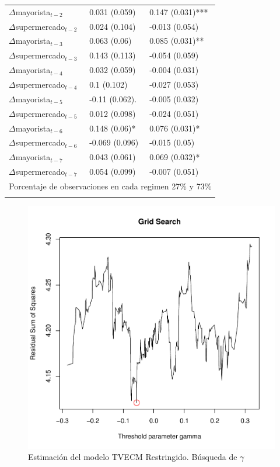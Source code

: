 \begin{table}[H]
\begin{tabular}{@{}lll@{}}
$\Delta$mayorista$_{t -2}$ & 0.031 (0.059) &0.147 (0.031)*** \\
$\Delta$supermercado$_{t -2}$ & 0.024 (0.104) &-0.013 (0.054) \\
$\Delta$mayorista$_{t -3}$ & 0.063 (0.06) &0.085 (0.031)** \\
$\Delta$supermercado$_{t -3}$ & 0.143 (0.113) &-0.054 (0.059) \\
$\Delta$mayorista$_{t -4}$ & 0.032 (0.059) &-0.004 (0.031) \\
$\Delta$supermercado$_{t -4}$ & 0.1 (0.102) &-0.027 (0.053) \\
$\Delta$mayorista$_{t -5}$ & -0.11 (0.062). &-0.005 (0.032) \\
$\Delta$supermercado$_{t -5}$ & 0.012 (0.098) &-0.024 (0.051) \\
$\Delta$mayorista$_{t -6}$ & 0.148 (0.06)* & 0.076 (0.031)* \\
$\Delta$supermercado$_{t -6}$ & -0.069 (0.096) &-0.015 (0.05) \\
$\Delta$mayorista$_{t -7}$ & 0.043 (0.061) &0.069 (0.032)* \\
$\Delta$supermercado$_{t -7}$ & 0.054 (0.099) &-0.007 (0.051) \\
\midrule 
\multicolumn{3}{c}{Porcentaje de observaciones en cada regimen 27\% y 73\%}  \\
 \bottomrule \\ 
\bottomrule
\end{tabular}
\end{table}

\begin{figure}[H]
\centering
\caption{Estimación del modelo TVECM Restringido. Búsqueda de $\gamma$}
\includegraphics[scale=0.7]{fig_results/fig8.pdf}
\end{figure}


